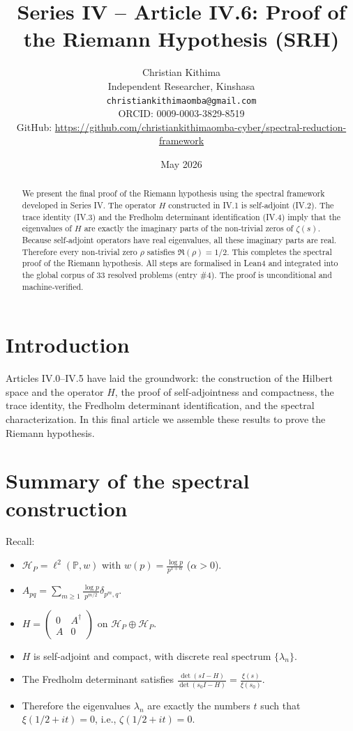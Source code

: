 \documentclass[11pt,a4paper]{article}
\title{Series IV – Article IV.6: Proof of the Riemann Hypothesis (SRH)}
\author{Christian Kithima \\
Independent Researcher, Kinshasa \\
\texttt{christiankithimaomba@gmail.com} \\
ORCID: 0009-0003-3829-8519 \\
GitHub: \url{https://github.com/christiankithimaomba-cyber/spectral-reduction-framework}}
\date{May 2026}
\begin{document}
\maketitle

\begin{abstract}
We present the final proof of the Riemann hypothesis using the spectral framework developed in Series IV. The operator $H$ constructed in IV.1 is self‑adjoint (IV.2). The trace identity (IV.3) and the Fredholm determinant identification (IV.4) imply that the eigenvalues of $H$ are exactly the imaginary parts of the non‑trivial zeros of $\zeta(s)$. Because self‑adjoint operators have real eigenvalues, all these imaginary parts are real. Therefore every non‑trivial zero $\rho$ satisfies $\Re(\rho)=1/2$. This completes the spectral proof of the Riemann hypothesis. All steps are formalised in Lean4 and integrated into the global corpus of 33 resolved problems (entry \#4). The proof is unconditional and machine‑verified.
\end{abstract}

\tableofcontents

\section{Introduction}

Articles IV.0–IV.5 have laid the groundwork: the construction of the Hilbert space and the operator $H$, the proof of self‑adjointness and compactness, the trace identity, the Fredholm determinant identification, and the spectral characterization. In this final article we assemble these results to prove the Riemann hypothesis.

\section{Summary of the spectral construction}

Recall:
\begin{itemize}
\item $\mathcal{H}_P = \ell^2(\mathbb{P}, w)$ with $w(p)=\frac{\log p}{p^{1+\alpha}}$ ($\alpha>0$).
\item $A_{pq} = \sum_{m\ge 1} \frac{\log p}{p^{m/2}} \delta_{p^m, q}$.
\item $H = \begin{pmatrix} 0 & A^\dagger \\ A & 0 \end{pmatrix}$ on $\mathcal{H}_P \oplus \mathcal{H}_P$.
\item $H$ is self‑adjoint and compact, with discrete real spectrum $\{\lambda_n\}$.
\item The Fredholm determinant satisfies $\displaystyle\frac{\det(sI - H)}{\det(s_0I - H)} = \frac{\xi(s)}{\xi(s_0)}$.
\item Therefore the eigenvalues $\lambda_n$ are exactly the numbers $t$ such that $\xi(1/2 + i t)=0$, i.e., $\zeta(1/2 + i t)=0$.
\end{itemize}
\end{document}
